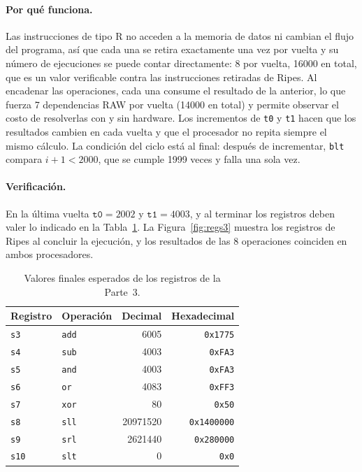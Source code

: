 \documentclass[11pt,a4paper]{article}
\begin{document}
\paragraph{Por qu\'e funciona.}
Las instrucciones de tipo R no acceden a la memoria de datos ni cambian el flujo
del programa, as\'i que cada una se retira exactamente una vez por vuelta y su
n\'umero de ejecuciones se puede contar directamente: 8 por vuelta, 16000 en
total, que es un valor verificable contra las instrucciones retiradas de
Ripes. Al encadenar las operaciones, cada una consume el resultado de la
anterior, lo que fuerza 7 dependencias RAW por vuelta (14000 en total) y permite
observar el costo de resolverlas con y sin hardware. Los incrementos de
\texttt{t0} y \texttt{t1} hacen que los resultados cambien en cada vuelta y que
el procesador no repita siempre el mismo c\'alculo. La condici\'on del ciclo est\'a
al final: despu\'es de incrementar, \texttt{blt} compara $i+1 < 2000$, que se
cumple 1999 veces y falla una sola vez.

\paragraph{Verificaci\'on.}
En la \'ultima vuelta $\texttt{t0} = 2002$ y $\texttt{t1} = 4003$, y al terminar
los registros deben valer lo indicado en la Tabla~\ref{tab:regs3}. La
Figura~\ref{fig:regs3} muestra los registros de Ripes al concluir la ejecuci\'on,
y los resultados de las 8 operaciones coinciden en ambos procesadores.

\begin{table}[h]
  \centering
  \small
  \begin{tabular}{@{}llrr@{}}
    \toprule
    Registro & Operaci\'on & Decimal & Hexadecimal \\
    \midrule
    \texttt{s3}  & \texttt{add}  & 6005     & \texttt{0x1775} \\
    \texttt{s4}  & \texttt{sub}  & 4003     & \texttt{0xFA3} \\
    \texttt{s5}  & \texttt{and}  & 4003     & \texttt{0xFA3} \\
    \texttt{s6}  & \texttt{or}   & 4083     & \texttt{0xFF3} \\
    \texttt{s7}  & \texttt{xor}  & 80       & \texttt{0x50} \\
    \texttt{s8}  & \texttt{sll}  & 20971520 & \texttt{0x1400000} \\
    \texttt{s9}  & \texttt{srl}  & 2621440  & \texttt{0x280000} \\
    \texttt{s10} & \texttt{slt}  & 0        & \texttt{0x0} \\
    \bottomrule
  \end{tabular}
  \caption{Valores finales esperados de los registros de la Parte~3.}
  \label{tab:regs3}
\end{table}
\end{document}
